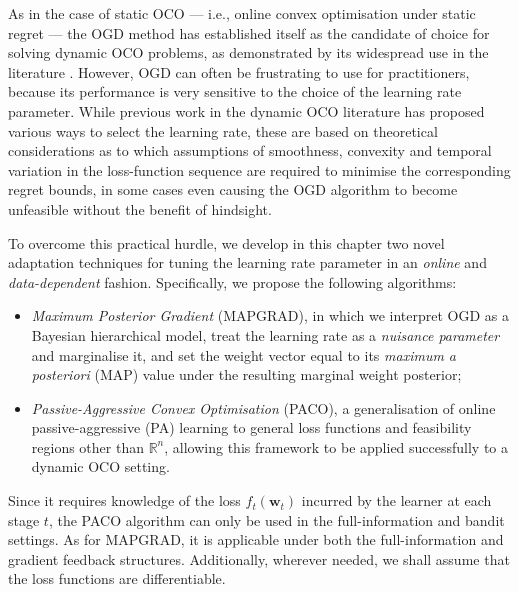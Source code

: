 As in the case of static OCO --- i.e., online convex optimisation under static regret --- the OGD method has established itself as the candidate of choice for solving dynamic OCO problems, as demonstrated by its widespread use in the literature \citep{besbes15, mokhtari16, yang16, zhang17, gao18}.
However, OGD can often be frustrating to use for practitioners, because its performance is very sensitive to the choice of the learning rate parameter. While previous work in the dynamic OCO literature has proposed various ways to select the learning rate, these are based on theoretical considerations as to which assumptions of smoothness, convexity and temporal variation in the loss-function sequence are required to minimise the corresponding regret bounds, in some cases even causing the OGD algorithm to become unfeasible without the benefit of hindsight.

To overcome this practical hurdle, we develop in this chapter two novel adaptation techniques for tuning the learning rate parameter in an \emph{online} and \emph{data-dependent} fashion. Specifically, we propose the following algorithms:
\begin{itemize}
	\item \emph{Maximum Posterior Gradient} (MAPGRAD), in which we interpret OGD as a Bayesian hierarchical model, treat the learning rate as a \emph{nuisance parameter} and marginalise it, and set the weight vector equal to its \emph{maximum a posteriori} (MAP) value under the resulting marginal weight posterior;
	\item \emph{Passive-Aggressive Convex Optimisation} (PACO), a generalisation of online passive-aggressive (PA) learning \citep{crammer06} to general loss functions and feasibility regions other than $\mathbb{R}^n$, allowing this framework to be applied successfully to a dynamic OCO setting.
\end{itemize}
\begin{mccorrection}
Since it requires knowledge of the loss $f_t(\mathbf{w}_t)$ incurred by the learner at each stage $t$, the PACO algorithm can only be used in the full-information and bandit settings. As for MAPGRAD, it is applicable under both the full-information and gradient feedback structures. Additionally, wherever needed, we shall assume that the loss functions are differentiable.
\end{mccorrection}

